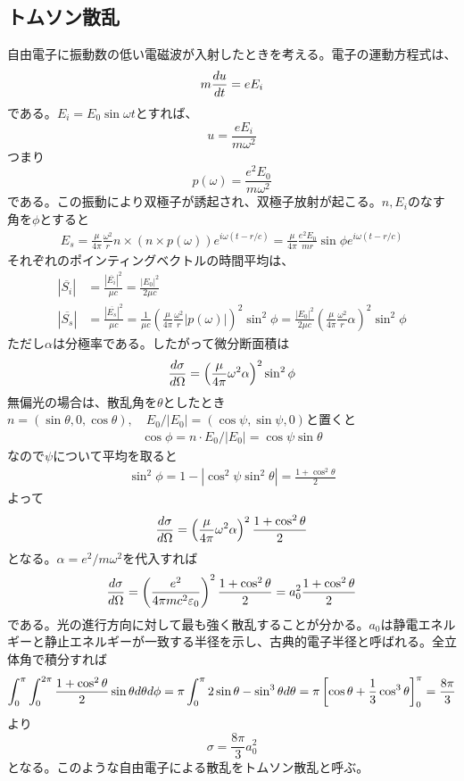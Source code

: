\subsection{トムソン散乱}
    自由電子に振動数の低い電磁波が入射したときを考える。電子の運動方程式は、
        \[m\de[u]{t} = eE_i\]
    である。$E_i = E_0\sin\omega t$とすれば、
        \[u = \frac{eE_i}{m\omega^2}\]
    つまり
        \[p(\omega) = \frac{e^2E_0}{m\omega^2}\]
    である。この振動により双極子が誘起され、双極子放射が起こる。$n,E_i$のなす角を$\phi$とすると
    \begin{align*}
        E_s = \frac{\mu}{4\pi}\frac{\omega^2}{r}{n\times(n\times p(\omega))}e^{i\omega(t - r/c)} = \frac{\mu}{4\pi}\frac{e^2E_0}{mr}\sin\phi e^{i\omega(t - r/c)}
    \end{align*}
    それぞれのポインティングベクトルの時間平均は、
    \begin{align*}
        |\overline{S_i}| &= \frac{|\overline{E_i}|^2}{\mu c} = \frac{|E_0|^2}{2\mu c}\\
        |\overline{S_s}| &= \frac{|\overline{E_s}|^2}{\mu c} = \frac{1}{\mu c}\left(\frac{\mu}{4\pi}\frac{\omega^2}{r}|p(\omega)|\right)^2\sin^2\phi = \frac{|E_0|^2}{2\mu c}\left(\frac{\mu}{4\pi}\frac{\omega^2}{r}\alpha\right)^2\sin^2\phi
    \end{align*}
    ただし$\alpha$は分極率である。したがって微分断面積は
    \begin{align*}
        \de[\sigma]{\Omega} = \left(\frac{\mu}{4\pi}\omega^2\alpha\right)^2\sin^2\phi           
    \end{align*}
    無偏光の場合は、散乱角を$\theta$としたとき$n = (\sin\theta, 0, \cos\theta), \quad E_0 / |E_0| = (\cos\psi, \sin\psi, 0)$と置くと
    \begin{align*}
        \cos\phi = n \cdot E_0 / |E_0| = \cos\psi\sin\theta
    \end{align*}
    なので$\psi$について平均を取ると
    \begin{align*}
        \sin^2\phi = 1 - |\cos^2\psi\sin^2\theta| = \frac{1 + \cos^2\theta}{2}
    \end{align*}
    よって
    \begin{align*}
        \de[\sigma]{\Omega} = \left(\frac{\mu}{4\pi}\omega^2\alpha\right)^2 \frac{1 + \cos^2\theta}{2}
    \end{align*}
    となる。$\alpha = e^2 / m\omega^2$を代入すれば
    \begin{align*}
        \de[\sigma]{\Omega} = \left(\frac{e^2}{4\pi mc^2\epsilon_0}\right)^2 \frac{1 + \cos^2\theta}{2} = a_0^2\frac{1 + \cos^2\theta}{2}
    \end{align*}
    である。光の進行方向に対して最も強く散乱することが分かる。$a_0$は静電エネルギーと静止エネルギーが一致する半径を示し、古典的電子半径と呼ばれる。全立体角で積分すれば
    \begin{align*}
        \int_0^\pi\int_0^{2\pi} \frac{1 + \cos^2\theta}{2}\sin\theta d\theta d\phi = \pi \int_0^\pi 2\sin\theta - \sin^3\theta d\theta = \pi \llr{\cos\theta + \frac{1}{3}\cos^3\theta}_0^\pi = \frac{8\pi}{3}
    \end{align*}
    より
        \[\sigma = \frac{8\pi}{3}a_0^2\]
    となる。このような自由電子による散乱をトムソン散乱と呼ぶ。

